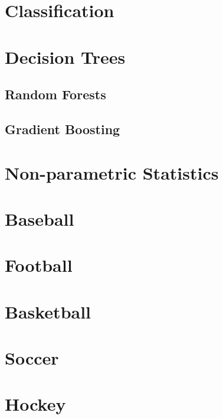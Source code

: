 \documentclass[
  11pt,
]{book}
\theoremstyle{definition}
\theoremstyle{definition}
\theoremstyle{definition}
\theoremstyle{definition}
\theoremstyle{remark}
\begin{document}
\hypertarget{classification}{%
\chapter{Classification}\label{classification}}

\hypertarget{decision-trees}{%
\chapter{Decision Trees}\label{decision-trees}}

\hypertarget{random-forests}{%
\section{Random Forests}\label{random-forests}}

\hypertarget{gradient-boosting}{%
\section{Gradient Boosting}\label{gradient-boosting}}

\hypertarget{non-parametric-statistics}{%
\chapter{Non-parametric Statistics}\label{non-parametric-statistics}}

\hypertarget{baseball-1}{%
\chapter{Baseball}\label{baseball-1}}

\hypertarget{football-1}{%
\chapter{Football}\label{football-1}}

\hypertarget{basketball-1}{%
\chapter{Basketball}\label{basketball-1}}

\hypertarget{soccer-1}{%
\chapter{Soccer}\label{soccer-1}}

\hypertarget{hockey-1}{%
\chapter{Hockey}\label{hockey-1}}
\end{document}
